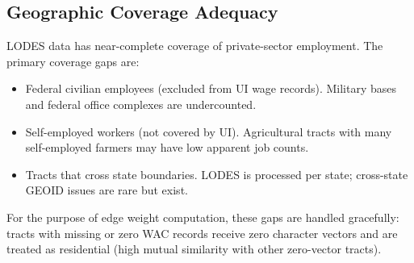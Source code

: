 \subsection{Geographic Coverage Adequacy}

LODES data has near-complete coverage of private-sector employment.
The primary coverage gaps are:
\begin{itemize}
  \item Federal civilian employees (excluded from UI wage records).
    Military bases and federal office complexes are undercounted.
  \item Self-employed workers (not covered by UI).
    Agricultural tracts with many self-employed farmers may have
    low apparent job counts.
  \item Tracts that cross state boundaries.
    LODES is processed per state; cross-state GEOID issues are rare but exist.
\end{itemize}
For the purpose of edge weight computation, these gaps are handled gracefully:
tracts with missing or zero WAC records receive zero character vectors and
are treated as residential (high mutual similarity with other zero-vector tracts).
